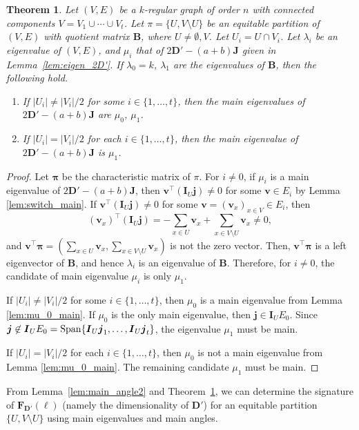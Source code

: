 \documentclass[a4paper, 11pt]{article}
\newcommand{\B}{\boldsymbol{B}}
\newcommand{\J}{\boldsymbol{J}}
\newcommand{\I}{\boldsymbol{I}}
\newcommand{\D}{\boldsymbol{D}}
\newcommand{\F}{\boldsymbol{F}}
\newcommand{\jv}{\boldsymbol{j}}
\newcommand{\vv}{\boldsymbol{v}}
\newcommand{\el}{\boldsymbol{\ell}}
\newtheorem{theorem}{Theorem}[section]
\theoremstyle{definition}
\begin{document}
\begin{theorem} \label{thm:regular_angle}
Let $(V,E)$ be a $k$-regular graph of order $n$ with connected components $V=V_1\cup \cdots \cup V_t$. 
Let $\pi=\{U, V\setminus U\}$ be an equitable partition of $(V,E)$ with quotient matrix $\B$, where $U\ne \emptyset,V$. Let $U_i=U \cap V_i$. 
Let $\lambda_i$ be an eigenvalue of $(V,E)$, and $\mu_i$ that of  $2\D'-(a+b)\J$ given in Lemma~\ref{lem:eigen_2D'}. 
If $\lambda_0=k$, $\lambda_1$ are the eigenvalues of $\B$,   
then the following hold.
 \begin{enumerate}
\item If $|U_i|\ne |V_i|/2$ for some $i\in \{1,\ldots, t\}$, then the main eigenvalues of $2\D'-(a+b)\J$ are $\mu_0$, $\mu_1$. 
\item If $|U_i|= |V_i|/2$ for each $i \in \{1, \ldots, t\}$, then the main eigenvalue of $2 \D'-(a+b)\J$ is $\mu_1$. 
\end{enumerate}
\end{theorem}
\begin{proof}
Let $\boldsymbol{\pi}$ be the characteristic matrix of $\pi$.
For $i\ne 0$, if $\mu_i$ is a main eigenvalue of $2\D'-(a+b)\J$, then $\vv^\top (\I_U \jv) \ne 0$ for some $\vv \in E_i$ by Lemma \ref{lem:switch_main}. 
If $\vv^\top (\I_U \jv) \ne 0$ for some $\vv=(\vv_x)_{x \in V} \in E_i$, then 
\[
(\vv_x)^\top (\I_U \jv)= -\sum_{x \in U}\vv_x+\sum_{x \in V\setminus U} \vv_x \ne 0,
\]
and $\vv^\top  \boldsymbol{\pi}=(\sum_{x \in U} \vv_x,\sum_{x \in V \setminus U} \vv_x)$ is not the zero vector. 
Then, $\vv^\top  \boldsymbol{\pi}$ is a left eigenvector of $\B$, and hence $\lambda_i$ is an eigenvalue of $\B$. 
Therefore, for $i\ne 0$, the candidate of main eigenvalue $\mu_i$ is only $\mu_1$. 

If $|U_i|\ne |V_i|/2$ for some $i\in \{1,\ldots, t\}$, then $\mu_0$ is a main eigenvalue from Lemma \ref{lem:mu_0_main}. 
If $\mu_0$ is the only main eigenvalue, then $\jv \in \I_U E_0$.  
Since $\jv \not\in \I_U E_0={\rm Span}\{\I_U \jv_1, \ldots, \I_U \jv_t\}$, the eigenvalue $\mu_1$ must be main. 

If $|U_i|= |V_i|/2$ for each $i \in \{1, \ldots, t\}$, then $\mu_0$ is not a main eigenvalue from Lemma \ref{lem:mu_0_main}. The remaining candidate $\mu_1$ must be main. 
\end{proof}
From Lemma~\ref{lem:main_angle2} and Theorem~\ref{thm:regular_angle}, we can determine the signature of $\F_{\D'}(\el)$ (namely the dimensionality of $\D'$) for an equitable partition $\{U,V\setminus U\}$ using main eigenvalues and main angles. 
\end{document}
